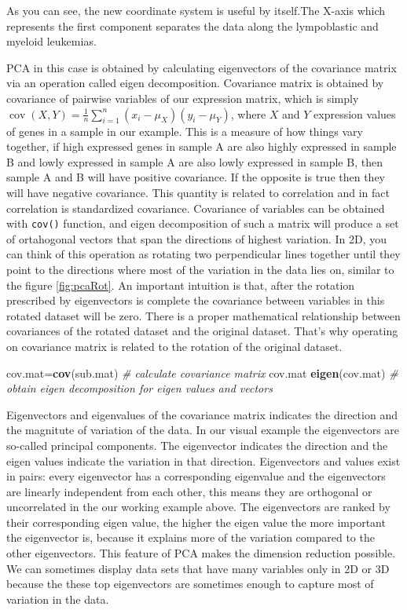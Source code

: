 \documentclass[12pt,]{krantz}
\newenvironment{Shaded}{\begin{snugshade}}{\end{snugshade}}
\newcommand{\CommentTok}[1]{\textcolor[rgb]{0.56,0.35,0.01}{\textit{#1}}}
\newcommand{\KeywordTok}[1]{\textcolor[rgb]{0.13,0.29,0.53}{\textbf{#1}}}
\newcommand{\NormalTok}[1]{#1}
\begin{document}
As you can see, the new coordinate system is useful by itself.The X-axis which represents the first component separates the data along the lympoblastic and myeloid leukemias.

PCA in this case is obtained by calculating eigenvectors of the covariance matrix via an operation called eigen decomposition. Covariance matrix is obtained by covariance of pairwise variables of our expression matrix, which is simply \({ \operatorname{cov} (X,Y)={\frac {1}{n}}\sum _{i=1}^{n}(x_{i}-\mu_X)(y_{i}-\mu_Y)}\), where \(X\) and \(Y\) expression values of genes in a sample in our example. This is a measure of how things vary together, if high expressed genes in sample A are also highly expressed in sample B and lowly expressed in sample A are also lowly expressed in sample B, then sample A and B will have positive covariance. If the opposite is true then they will have negative covariance. This quantity is related to correlation and in fact correlation is standardized covariance. Covariance of variables can be obtained with \texttt{cov()} function, and eigen decomposition of such a matrix will produce a set of ortahogonal vectors that span the directions of highest variation. In 2D, you can think of this operation as rotating two perpendicular lines together until they point to the directions where most of the variation in the data lies on, similar to the figure \ref{fig:pcaRot}. An important intuition is that, after the rotation prescribed by eigenvectors is complete the covariance between variables in this rotated dataset will be zero. There is a proper mathematical relationship between covariances of the rotated dataset and the original dataset. That's why operating on covariance matrix is related to the rotation of the original dataset.

\begin{Shaded}
\begin{Highlighting}[]
\NormalTok{cov.mat=}\KeywordTok{cov}\NormalTok{(sub.mat) }\CommentTok{# calculate covariance matrix}
\NormalTok{cov.mat}
\KeywordTok{eigen}\NormalTok{(cov.mat) }\CommentTok{# obtain eigen decomposition for eigen values and vectors}
\end{Highlighting}
\end{Shaded}

Eigenvectors and eigenvalues of the covariance matrix indicates the direction and the magnitute of variation of the data. In our visual example the eigenvectors are so-called principal components. The eigenvector indicates the direction and the eigen values indicate the variation in that direction. Eigenvectors and values exist in pairs: every eigenvector has a corresponding eigenvalue and the eigenvectors are linearly independent from each other, this means they are orthogonal or uncorrelated in the our working example above. The eigenvectors are ranked by their corresponding eigen value, the higher the eigen value the more important the eigenvector is, because it explains more of the variation compared to the other eigenvectors. This feature of PCA makes the dimension reduction possible. We can sometimes display data sets that have many variables only in 2D or 3D because the these top eigenvectors are sometimes enough to capture most of variation in the data.
\end{document}
